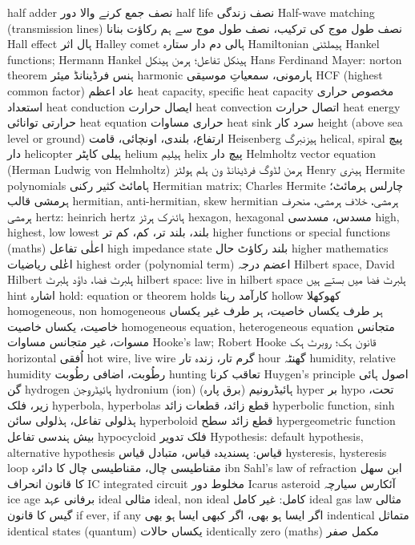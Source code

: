 half adder	نصف جمع کرنے والا دور
half life	نصف زندگی
Half-wave matching (transmission lines)	نصف طول موج کی ترکیب، نصف طول موج سے ہم رکاؤت بنانا
Hall effect	ہال اثر
Halley comet	ہالی دم دار ستارہ
Hamiltonian	ہیملٹنی
Hankel functions; Hermann Hankel	ہینکل تفاعل؛ ہرمن ہینکل
Hans Ferdinand Mayer: norton theorem	ہنس فرڈینانڈ میئر
harmonic	ہارمونی، سمعیاتِ موسیقی
HCF (highest common factor)	عاد اعظم
heat capacity, specific heat capacity	مخصوص حراری استعداد
heat conduction	ایصال حرارت
heat convection	اتصال حرارت
heat energy	حرارتی توانائی
heat equation	حراری مساوات
heat sink	سرد کار
height (above sea level or ground)	ارتفاع، بلندی، اونچائی، قامت
Heisenberg	ہیزنبرگ
helical, spiral	پیچ دار
helicopter	ہیلی کاپٹر
helium	ہیلیم
helix	پیچ دار
Helmholtz vector equation (Herman Ludwig von Helmholtz)	ہرمن لڈوگ فرڈینانڈ ون ہلم ہولٹز
Henry	ہینری
Hermite polynomials	ہامائٹ کثیر رکنی
Hermitian matrix; Charles Hermite	چارلس ہرمائٹ؛ ہرمشی قالب
hermitian, anti-hermitian, skew hermitian	ہرمشی، خلاف ہرمشی، منحرف ہرمشی
hertz: heinrich hertz	ہائنرک ہرٹز
hexagon, hexagonal	مسدس، مسدسی
high, highest, low lowest	بلند، بلند تر، کم، کم تر
higher functions or special functions (maths)	اعلٰی تفاعل
high impedance state	بلند رکاؤٹ حال
higher mathematics	اعٰٰلی ریاضیات
highest order (polynomial term)	اعضم درجہ
Hilbert space, David Hilbert	ہلبرٹ فضا، داؤد ہلبرٹ
hilbert space: live in hilbert space	ہلبرٹ فضا میں بستے ہیں
hint	اشارہ
hold: equation or theorem holds 	کارآمد رہنا
hollow	کھوکھلا
homogeneous, non homogeneous	ہر طرف یکساں خاصیت، ہر طرف غیر یکساں خاصیت، یکساں خاصیت
homogeneous equation, heterogeneous equation	متجانس مسوات، غیر متجانس مساوات
Hooke's law; Robert Hooke	قانون ہک؛ روبرٹ ہک
horizontal	اُفقی
hot wire, live wire	گرم تار، زندہ تار
hour	گھنٹہ
humidity, relative humidity	رطُوبت، اضافی رطُوبت
hunting	تعاقب کرنا
Huygen's principle	اصول ہائی گن
hydrogen	ہائیڈروجن
hydronium (ion)	ہائیڈرونیم (برق پارہ)
hyper	بر
hypo	تحت، زیر، فلک
hyperbola, hyperbolas	قطع زائد، قطعات زائد
hyperbolic function, sinh	ہذلولی تفاعل، ہذلولی سائن
hyperboloid	قطع زائد سطح
hypergeometric function	بیش ہندسی تفاعل
hypocycloid	فلک تدویر
Hypothesis: default hypothesis, alternative hypothesis	قیاس: پسندیدہ قیاس، متبادل قیاس
hysteresis, hysteresis loop	مقناطیسی چال، مقناطیسی چال کا دائرہ
ibn Sahl's law of refraction	ابن سھل کا قانون انحراف
IC integrated circuit	مخلوط دور
Icarus asteroid	آئکارس سیارچہ
ice age	برفانی عہد
ideal	مثالی
ideal, non ideal	کامل: غیر کامل
ideal gas law	مثالی گیس کا قانون
if ever, if any	اگر ایسا ہو بھی، اگر کبھی ایسا ہو بھی
indentical	متماثل
identical states (quantum)	یکساں حالات
identically zero (maths)	مکمل صفر
